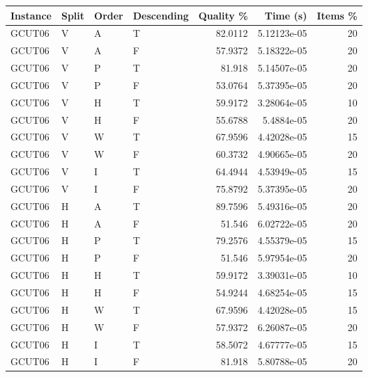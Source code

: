 \begin{tabular}{llllrrr}
    \hline
    Instance & Split & Order & Descending & Quality \% & Time (s)    & Items \% \\
    \hline
    GCUT06   & V     & A     & T          & 82.0112    & 5.12123e-05 & 20       \\
    GCUT06   & V     & A     & F          & 57.9372    & 5.18322e-05 & 20       \\
    GCUT06   & V     & P     & T          & 81.918     & 5.14507e-05 & 20       \\
    GCUT06   & V     & P     & F          & 53.0764    & 5.37395e-05 & 20       \\
    GCUT06   & V     & H     & T          & 59.9172    & 3.28064e-05 & 10       \\
    GCUT06   & V     & H     & F          & 55.6788    & 5.4884e-05  & 20       \\
    GCUT06   & V     & W     & T          & 67.9596    & 4.42028e-05 & 15       \\
    GCUT06   & V     & W     & F          & 60.3732    & 4.90665e-05 & 20       \\
    GCUT06   & V     & I     & T          & 64.4944    & 4.53949e-05 & 15       \\
    GCUT06   & V     & I     & F          & 75.8792    & 5.37395e-05 & 20       \\
    GCUT06   & H     & A     & T          & 89.7596    & 5.49316e-05 & 20       \\
    GCUT06   & H     & A     & F          & 51.546     & 6.02722e-05 & 20       \\
    GCUT06   & H     & P     & T          & 79.2576    & 4.55379e-05 & 15       \\
    GCUT06   & H     & P     & F          & 51.546     & 5.97954e-05 & 20       \\
    GCUT06   & H     & H     & T          & 59.9172    & 3.39031e-05 & 10       \\
    GCUT06   & H     & H     & F          & 54.9244    & 4.68254e-05 & 15       \\
    GCUT06   & H     & W     & T          & 67.9596    & 4.42028e-05 & 15       \\
    GCUT06   & H     & W     & F          & 57.9372    & 6.26087e-05 & 20       \\
    GCUT06   & H     & I     & T          & 58.5072    & 4.67777e-05 & 15       \\
    GCUT06   & H     & I     & F          & 81.918     & 5.80788e-05 & 20       \\

\end{tabular}
